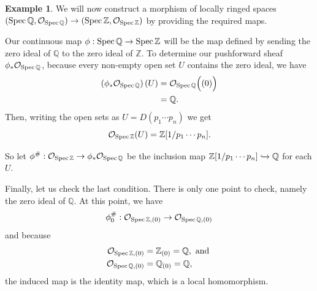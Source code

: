 \documentclass[a4,12pt]{article}
\theoremstyle{definition}
\newtheorem{example}{Example}[section]
\theoremstyle{remark}
\theoremstyle{plain}
\numberwithin{equation}{section}
\newcommand{\Z}{\mathbb{Z}}
\newcommand{\Q}{\mathbb{Q}}
\newcommand{\Spec}{\textnormal{Spec}\,}
\newcommand{\2}[4]{\begin{bmatrix}#1 & #2 \\ #3 & #4 \end{bmatrix}} %
\newcommand{\3}[9]{\begin{bmatrix}#1 & #2 & #3 \\ #4 & #5 & #6 \\ #7 & #8 & #9 \end{bmatrix}} %
\begin{document}
\begin{example}\label{Good Q to Z}
We will now construct a morphism of locally ringed spaces $(\Spec \Q, \mathcal{O}_{\Spec\Q}) \to (\Spec\Z, \mathcal{O}_{\Spec\Z})$ by providing the required maps.
\end{example}
Our continuous map $\phi : \Spec\Q \to \Spec\Z$ will be the map defined by sending the zero ideal of $\Q$ to the zero ideal of $\Z$. To determine our pushforward sheaf $\phi_\ast \mathcal{O}_{\Spec\Q}$, because every non-empty open set $U$ contains the zero ideal, we have
\begin{align*}
(\phi_\ast \mathcal{O}_{\Spec\Q})\left(U\right)
&= 	
\mathcal{O}_{\Spec\Q}\Big((0)\Big)\\
&= \Q.
\end{align*}
Then, writing the open sets as $U = D(p_1 \cdots p_n)$ we get
\begin{equation}
\mathcal{O}_{\Spec\Z}(U) = \Z[1/p_1 \cdots p_n].
\end{equation}

So let $\phi^\# : \mathcal{O}_{\Spec\Z} \to \phi_\ast\mathcal{O}_{\Spec\Q}$ be the inclusion map $\Z[1/p_1\cdots p_n] \xhookrightarrow{} \Q$ for each $U$.

Finally, let us check the last condition.
There is only one point to check, namely the zero ideal of \(\mathbb{Q}\).
At this point, we have
\[\phi_0^\# : \mathcal{O}_{\Spec\Z, (0)} \to \mathcal{O}_{\Spec\Q, (0)}\] and because
\begin{align*}
\mathcal{O}_{\Spec\Z, (0)} 	&= 	\Z_{(0)} = \Q, \text{ and }\\
\mathcal{O}_{\Spec\Q, (0)} 	&= 	\Q_{(0)} = \Q,
\end{align*}
the induced map is the identity map, which is a local homomorphism.
\end{document}

